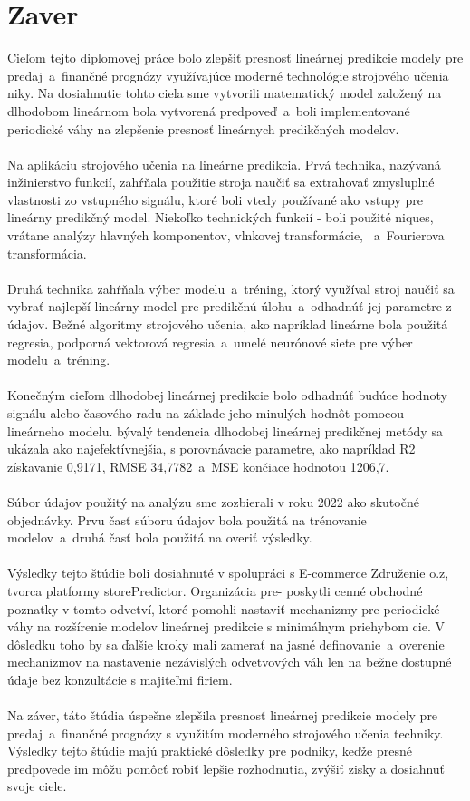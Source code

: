    \section{Zaver}
    Cieľom tejto diplomovej práce bolo zlepšiť presnosť lineárnej predikcie
    modely pre predaj~a~finančné prognózy využívajúce moderné technológie strojového učenia
    niky. Na dosiahnutie tohto cieľa sme vytvorili matematický model založený na dlhodobom lineárnom
    bola vytvorená predpoveď~a~boli implementované periodické váhy na zlepšenie
    presnosť lineárnych predikčných modelov.\\
    \\
    Na aplikáciu strojového učenia na lineárne predikcia. Prvá technika, nazývaná inžinierstvo funkcií,
    zahŕňala použitie stroja naučiť sa extrahovať zmysluplné vlastnosti zo vstupného signálu, ktoré boli vtedy
    používané ako vstupy pre lineárny predikčný model. Niekoľko technických funkcií -
    boli použité niques, vrátane analýzy hlavných komponentov, vlnkovej transformácie,
   ~a~Fourierova transformácia.\\
    \\
    Druhá technika zahŕňala výber modelu~a~tréning, ktorý využíval stroj
    naučiť sa vybrať najlepší lineárny model pre predikčnú úlohu~a~odhadnúť jej
    parametre z údajov. Bežné algoritmy strojového učenia, ako napríklad lineárne
    bola použitá regresia, podporná vektorová regresia~a~umelé neurónové siete
    pre výber modelu~a~tréning.\\
    \\
    Konečným cieľom dlhodobej lineárnej predikcie bolo odhadnúť budúce hodnoty
    signálu alebo časového radu na základe jeho minulých hodnôt pomocou lineárneho modelu. bývalý
    tendencia dlhodobej lineárnej predikčnej metódy sa ukázala ako najefektívnejšia, s
    porovnávacie parametre, ako napríklad R2 získavanie 0,9171, RMSE 34,7782~a~MSE
    končiace hodnotou 1206,7.\\
    \\
    Súbor údajov použitý na analýzu sme zozbierali v roku 2022 ako skutočné objednávky. Prvu
    časť súboru údajov bola použitá na trénovanie modelov~a~druhá časť bola použitá na
    overiť výsledky.\\
    \\
    Výsledky tejto štúdie boli dosiahnuté v spolupráci s E-commerce
    Združenie o.z, tvorca platformy storePredictor. Organizácia pre-
    poskytli cenné obchodné poznatky v tomto odvetví, ktoré pomohli nastaviť mechanizmy
    pre periodické váhy na rozšírenie modelov lineárnej predikcie s minimálnym priehybom
    cie. V dôsledku toho by sa ďalšie kroky mali zamerať na jasné definovanie~a~overenie
    mechanizmov na nastavenie nezávislých odvetvových váh len na bežne dostupné údaje
    bez konzultácie s majiteľmi firiem.\\
    \\
    Na záver, táto štúdia úspešne zlepšila presnosť lineárnej predikcie
    modely pre predaj~a~finančné prognózy s využitím moderného strojového učenia
    techniky. Výsledky tejto štúdie majú praktické dôsledky pre podniky,
    keďže presné predpovede im môžu pomôcť robiť lepšie rozhodnutia, zvýšiť zisky a
    dosiahnuť svoje ciele.
